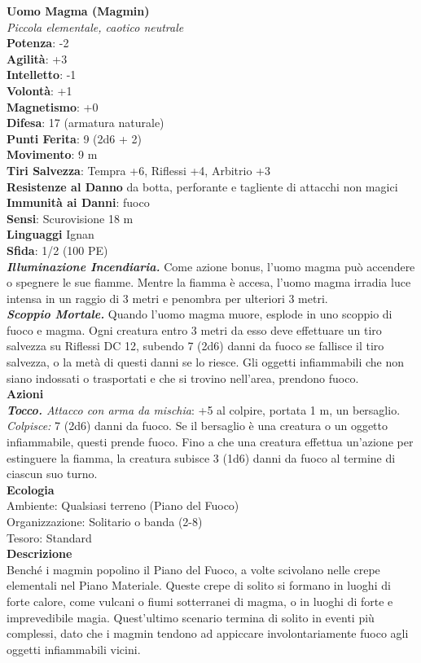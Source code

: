 \begin{multicols}{2}
\medskip\textbf{Uomo Magma (Magmin)}\\
\emph{Piccola elementale, caotico neutrale}\\
\textbf{Potenza}: -2\\
\textbf{Agilità}: +3\\
\textbf{Intelletto}: -1\\
\textbf{Volontà}: +1\\
\textbf{Magnetismo}: +0\\
\textbf{Difesa}: 17 (armatura naturale)\\
\textbf{Punti Ferita}: 9 (2d6 + 2)\\
\textbf{Movimento}: 9 m\\
\textbf{Tiri Salvezza}: Tempra +6, Riflessi +4, Arbitrio +3\\
\textbf{Resistenze al Danno} da botta, perforante e tagliente di attacchi non magici\\
\textbf{Immunità ai Danni}: fuoco\\
\textbf{Sensi}: Scurovisione 18 m\\
\textbf{Linguaggi} Ignan\\
\textbf{Sfida}: 1/2 (100 PE)\smallskip\\
\emph{\textbf{Illuminazione Incendiaria.}} Come azione bonus, l'uomo magma può accendere o spegnere le sue fiamme. Mentre la fiamma è accesa, l'uomo magma irradia luce intensa in un raggio di 3 metri e penombra per ulteriori 3 metri.\\
\emph{\textbf{Scoppio Mortale.}} Quando l'uomo magma muore, esplode in uno scoppio di fuoco e magma. Ogni creatura entro 3 metri da esso deve effettuare un tiro salvezza su Riflessi DC  12, subendo 7 (2d6) danni da fuoco se fallisce il tiro salvezza, o la metà di questi danni se lo riesce. Gli oggetti infiammabili che non siano indossati o trasportati e che si trovino nell'area, prendono fuoco.\\
\smallskip\textbf{Azioni}\\
\emph{\textbf{Tocco.} Attacco con arma da mischia}: +5 al colpire, portata 1 m, un bersaglio.\\
\emph{Colpisce:} 7 (2d6) danni da fuoco. Se il bersaglio è una creatura o un oggetto infiammabile, questi prende fuoco. Fino a che una creatura effettua un'azione per estinguere la fiamma, la creatura subisce 3 (1d6) danni da fuoco al termine di ciascun suo turno.\\
\textbf{Ecologia}\\
Ambiente: Qualsiasi terreno (Piano del Fuoco)\\
Organizzazione: Solitario o banda (2-8)\\
Tesoro: Standard\\
\textbf{Descrizione}\\
Benché i magmin popolino il Piano del Fuoco, a volte scivolano nelle crepe elementali nel Piano Materiale. Queste crepe di solito si formano in luoghi di forte calore, come vulcani o fiumi sotterranei di magma, o in luoghi di forte e imprevedibile magia. Quest'ultimo scenario termina di solito in eventi più complessi, dato che i magmin tendono ad appiccare involontariamente fuoco agli oggetti infiammabili vicini.\\


\end{multicols}
